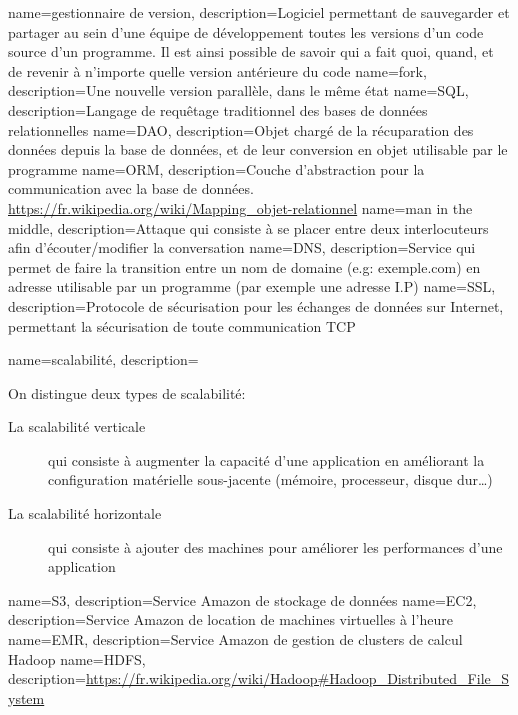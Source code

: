 {
  name=gestionnaire de version,
  description={Logiciel permettant de sauvegarder et partager au sein d'une équipe de développement toutes les versions d'un code source d'un programme. Il est ainsi possible de savoir qui a fait quoi, quand, et de revenir à n'importe quelle version antérieure du code}
}
{
  name=fork,
  description={Une nouvelle version parallèle, dans le même état}
}
{
  name=SQL,
  description=Langage de requêtage traditionnel des bases de données relationnelles
}
{
  name=DAO,
  description={Objet chargé de la récuparation des données depuis la base de données, et de leur conversion en objet utilisable par le programme}
}
{
  name=ORM,
  description={Couche d'abstraction pour la communication avec la base de données. \url{https://fr.wikipedia.org/wiki/Mapping_objet-relationnel}}
}
{
  name=man in the middle,
  description={Attaque qui consiste à se placer entre deux interlocuteurs afin d'écouter/modifier la conversation}
}
{
  name=DNS,
  description={Service qui permet de faire la transition entre un nom de domaine (e.g: exemple.com) en adresse utilisable par un programme (par exemple une adresse I.P)}
}
{
  name=SSL,
  description={Protocole de sécurisation pour les échanges de données sur Internet, permettant la sécurisation de toute communication TCP}
}
{
  name=scalabilité,
  description={On distingue deux types de scalabilité:
\begin{description}
\item[La scalabilité verticale] qui consiste à augmenter la capacité d'une application en améliorant la configuration matérielle sous-jacente (mémoire, processeur, disque dur…)
\item[La scalabilité horizontale] qui consiste à ajouter des machines pour améliorer les performances d'une application
\end{description}}
}
{
    name=S3,
    description={Service Amazon de stockage de données}
}
{
    name=EC2,
    description={Service Amazon de location de machines virtuelles à l'heure}
}
{
    name=EMR,
    description={Service Amazon de gestion de clusters de calcul Hadoop}
}
{
    name=HDFS,
    description={\url{https://fr.wikipedia.org/wiki/Hadoop\#Hadoop_Distributed_File_System}}
}
